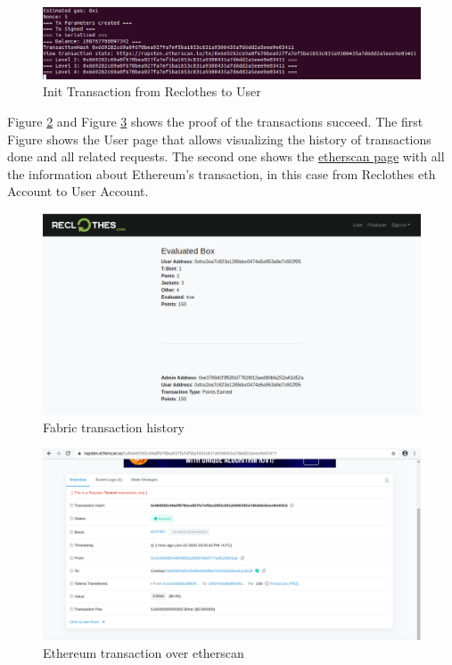 \begin{figure}[h!]
	\centering
    \includegraphics[totalheight=3cm]{img/test/test1/performed-tx-RU.png}
	\caption{Init Transaction from Reclothes to User}
	\label{fig:tx-reclothes-user}
\end{figure}

Figure \ref{fig:fabric-tx} and Figure \ref{fig:eth-tx} shows the proof of the transactions succeed. 
The first Figure shows the User page that allows visualizing the history of transactions done and all related 
requests. The second one shows the \href{https://ropsten.etherscan.io/tx/0x669282c69a0f670bea927fa7ef5ba1853c831a9300435a7d6dd2a5eee9e03411}{etherscan page} with all the information about Ethereum's transaction, in 
this case from Reclothes eth Account to User Account.

\begin{figure}[h!]
	\centering
    \includegraphics[totalheight=7cm]{img/test/test1/fabrix-tx.png}
	\caption{Fabric transaction history}
	\label{fig:fabric-tx}
\end{figure}

\begin{figure}[h!]
	\centering
    \includegraphics[totalheight=7cm]{img/test/test1/etherscan.png}
	\caption{Ethereum transaction over etherscan}
	\label{fig:eth-tx}
\end{figure}

